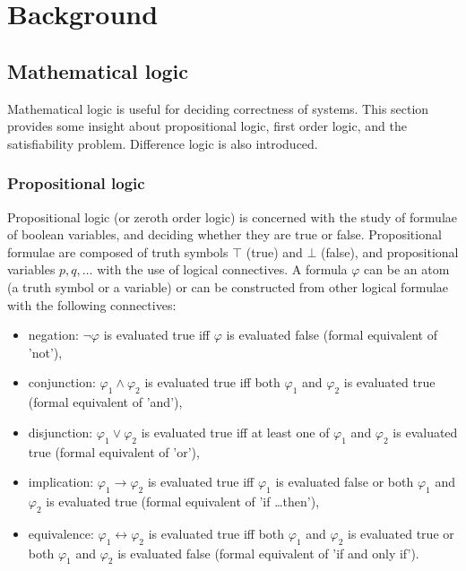 \chapter{Background}
\label{chap:background}


\section{Mathematical logic}

Mathematical logic is useful for deciding correctness of systems. This section provides some insight about propositional logic, first order logic, and the satisfiability problem. Difference logic is also introduced.

\subsection{Propositional logic}

Propositional logic (or zeroth order logic) is concerned with the study of formulae of boolean variables, and deciding whether they are true or false. Propositional formulae are composed of truth symbols $\top$ (true) and $\bot$ (false),  and propositional variables $p,q, \dots$ with the use of logical connectives. A formula $\varphi$ can be an atom (a truth symbol or a variable) or can be constructed from other logical formulae with the following connectives:

\begin{itemize}
	\item negation: $\neg\varphi$ is evaluated true iff $\varphi$ is evaluated false (formal equivalent of 'not'),
	\item conjunction: $\varphi_1 \wedge \varphi_2$ is evaluated true iff  both $\varphi_1$ and $\varphi_2$ is evaluated true (formal equivalent of 'and'),
	\item disjunction: $\varphi_1 \vee \varphi_2$ is evaluated true iff  at least one of $\varphi_1$ and $\varphi_2$ is evaluated true (formal equivalent of 'or'),
	\item implication: $\varphi_1 \to \varphi_2$ is evaluated true iff  $\varphi_1$ is evaluated false or both $\varphi_1$ and $\varphi_2$ is evaluated true (formal equivalent of 'if \ldots then'),
	\item equivalence: $\varphi_1 \leftrightarrow \varphi_2$ is evaluated true iff   both $\varphi_1$ and $\varphi_2$ is evaluated true or  both $\varphi_1$ and $\varphi_2$ is evaluated false (formal equivalent of 'if and only if').
\end{itemize}

